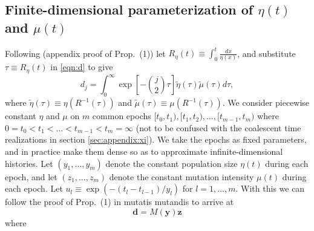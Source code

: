 \subsection{Finite-dimensional parameterization of $\eta(t)$ and $\mu(t)$}\label{sec:appendix:pcsws}


Following \cite{Rosen2018-bb} (appendix proof of Prop.\ (1)) let $R_\eta(t) \equiv \int_0^t\frac{dx}{\eta(x)}$, and substitute $\tau \equiv R_\eta(t)$ in \eqref{eqn:d} to give
\begin{equation}
\label{eqn:d2}
d_j = \int_0^\infty \exp\left[-\binom{j}{2}\tau\right] \tilde\eta(\tau)\tilde\mu(\tau)d\tau,
\end{equation}
where $\tilde\eta(\tau) \equiv \eta(R^{-1}(\tau))$ and $\tilde\mu(\tau) \equiv \mu(R^{-1}(\tau))$.
We consider piecewise constant $\eta$ and $\mu$ on $m$ common epochs $[t_0, t_1), [t_1, t_2),\dots, [t_{m-1}, t_m)$ where $0=t_0 < t_1 < \dots < t_{m-1} < t_m=\infty$ (not to be confused with the coalescent time realizations in section \ref{sec:appendix:xi}).
We take the epochs as fixed parameters, and in practice make them dense so as to approximate infinite-dimensional histories.
Let $(y_1,\dots,y_m)$ denote the constant population size $\eta(t)$ during each epoch, and let $(z_1,\dots,z_m)$ denote the constant mutation intensity $\mu(t)$ during each epoch.
Let $u_l \equiv \exp(-(t_l-t_{l-1})/y_l)$ for $l=1,\dots,m$. %
With this we can follow the proof of Prop.\ (1) in \cite{Rosen2018-bb} mutatis mutandis to arrive at
\begin{equation}
\label{eqn:d3}
\boldsymbol d = M(\boldsymbol y) \boldsymbol z
\end{equation}
where
